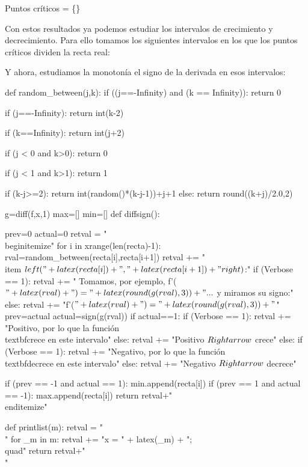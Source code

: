 Puntos críticos = \{\}
\fi



\ifverbose
Con estos resultados ya podemos estudiar los intervalos de crecimiento y decrecimiento. 
%
Para ello tomamos los siguientes intervalos en los que los puntos críticos dividen la recta real:
\fi


\ifverbose
Y ahora, estudiamos la monotonía el signo de la derivada en esos intervalos:
\fi
\begin{sagesilent}


def random_between(j,k):
    if ((j==-Infinity) and (k == Infinity)):
        return 0

    if (j==-Infinity):
        return int(k-2)
        
    if (k==Infinity):
        return int(j+2)
    
    if (j < 0 and k>0):
        return 0
    
    if (j < 1 and k>1):
        return 1
    

    if (k-j>=2):
        return int(random()*(k-j-1))+j+1
    else:
        return round((k+j)/2.0,2)
        

g=diff(f,x,1)
max=[]
min=[]
def diffsign():

    prev=0
    actual=0
    retval = "\\begin{itemize}"
    for i in xrange(len(recta)-1):
        rval=random_between(recta[i],recta[i+1])
        retval += "\\item $\\left("+latex(recta[i])+","+latex(recta[i+1])+"\\right)$:"
        if (Verbose == 1):
            retval += " Tomamos, por ejemplo, f'($"+latex(rval)+") = "+latex(round(g(rval),3))+"...$  y miramos su signo:" 
        else:
            retval += "f'($"+latex(rval)+") = "+latex(round(g(rval),3)) +"$"
        prev=actual
        actual=sign(g(rval))
        if actual==1: 
            if (Verbose == 1):
                retval += "Positivo, por lo que la función \\textbf{crece} en este intervalo"  
            else:
                retval += "Positivo $\\Rightarrow$ crece"
        else:
            if (Verbose == 1):
                retval += "Negativo, por lo que la función \\textbf{decrece} en este intervalo"
            else:
                retval += "Negativo $\\Rightarrow$ decrece"

        if (prev == -1 and actual == 1):
            min.append(recta[i])
        if (prev == 1 and actual == -1):
            max.append(recta[i])
    return retval+"\\end{itemize}"

def printlist(m):
    retval = "\\{"
    for _m in m:
    	retval += "x = " + latex(_m) + ";\\quad"
    return retval+"\\}"

\end{sagesilent}

